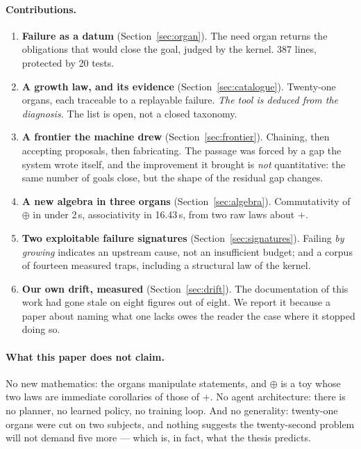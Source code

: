 \documentclass[11pt]{article}
\theoremstyle{remark}\newtheorem{remark}{Remark}
\begin{document}
\paragraph{Contributions.}
\begin{enumerate}\itemsep2pt
\item \textbf{Failure as a datum} (Section~\ref{sec:organ}). The need organ returns the
obligations that would close the goal, judged by the kernel. 387 lines, protected by 20
tests.
\item \textbf{A growth law, and its evidence} (Section~\ref{sec:catalogue}). Twenty-one
organs, each traceable to a replayable failure. \emph{The tool is deduced from the
diagnosis.} The list is open, not a closed taxonomy.
\item \textbf{A frontier the machine drew} (Section~\ref{sec:frontier}). Chaining,
then accepting proposals, then fabricating. The passage was forced by a gap the system
wrote itself, and the improvement it brought is \emph{not} quantitative: the same number
of goals close, but the shape of the residual gap changes.
\item \textbf{A new algebra in three organs} (Section~\ref{sec:algebra}). Commutativity
of $\oplus$ in under 2\,s, associativity in 16.43\,s, from two raw laws about $+$.
\item \textbf{Two exploitable failure signatures} (Section~\ref{sec:signatures}).
Failing \emph{by growing} indicates an upstream cause, not an insufficient budget; and a
corpus of fourteen measured traps, including a structural law of the kernel.
\item \textbf{Our own drift, measured} (Section~\ref{sec:drift}). The documentation of
this work had gone stale on eight figures out of eight. We report it because a paper
about naming what one lacks owes the reader the case where it stopped doing so.
\end{enumerate}

\paragraph{What this paper does not claim.} No new mathematics: the organs manipulate
statements, and $\oplus$ is a toy whose two laws are immediate corollaries of those of
$+$. No agent architecture: there is no planner, no learned policy, no training loop.
And no generality: twenty-one organs were cut on two subjects, and nothing suggests the
twenty-second problem will not demand five more --- which is, in fact, what the thesis
predicts.
\end{document}
